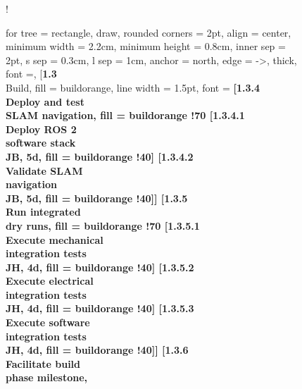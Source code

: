 \begin{figure}[H]
\centering
\resizebox{\textwidth} { ! }
{
\begin { forest }
  for
    tree =
        {
            rectangle,
            draw,
            rounded corners = 2pt,
            align = center,
            minimum width = 2.2cm,
            minimum height = 0.8cm,
            inner sep = 2pt,
            s sep = 0.3cm,
            l sep = 1cm,
            anchor = north,
            edge = {->, thick},
            font =\scriptsize,
        }[{\textbf{1.3}\\Build}, fill = buildorange, line width = 1.5pt,
          font =\scriptsize\bfseries
              [{\textbf{1.3.4}\\Deploy and test\\SLAM navigation},
               fill =
                   buildorange !70 [{\textbf{1.3.4.1}\\Deploy ROS 2\\software
                                            stack\\{\tiny JB, 5d}},
                                    fill = buildorange !40]
                                   [{\textbf{1.3.4.2}\\Validate
                                            SLAM\\navigation\\{\tiny JB, 5d}},
                                    fill = buildorange !40]]
              [{\textbf{1.3.5}\\Run integrated\\dry runs},
               fill = buildorange !70
                   [{\textbf{1.3.5.1}\\Execute mechanical\\integration
                            tests\\{\tiny JH, 4d}},
                    fill = buildorange !40]
                   [{\textbf{1.3.5.2}\\Execute electrical\\integration
                            tests\\{\tiny JH, 4d}},
                    fill = buildorange !40]
                   [{\textbf{1.3.5.3}\\Execute software\\integration
                            tests\\{\tiny JH, 4d}},
                    fill = buildorange !40]]
              [{\textbf{1.3.6}\\Facilitate build\\phase milestone},

\end{ forest }}
\end{figure}
